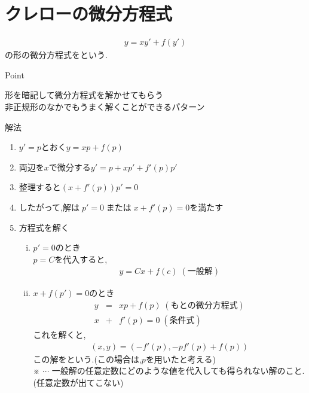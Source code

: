 \documentclass[a4paper]{jsarticle}
\begin{document}
\section{クレローの微分方程式}
\begin{eqnarray*}
    y=xy'+f\left(y'\right)
\end{eqnarray*}
の形の微分方程式をという.\\
\begin{itembox}[l]{Point}
    \begin{center}
        形を暗記して微分方程式を解かせてもらう\\
        非正規形のなかでもうまく解くことができるパターン
    \end{center}
\end{itembox}
\begin{itembox}[l]{解法}
    \begin{enumerate}[(1)]
        \item$y'=p$とおく\quad$y=xp+f\left(p\right)$
        \item 両辺を$x$で微分する\quad$y'=p+xp'+f'\left(p\right)p'$
        \item 整理すると\quad$\left(x+f'\left(p\right)\right)p'=0$
        \item したがって,解は$\;p'=0\;$または$\; x+f'\left(p\right)=0$を満たす
        \item 方程式を解く
              \begin{enumerate}[(i)]
                  \item $p'=0$のとき\\
                        $p=C$を代入すると,
                        \begin{eqnarray*}
                            y=Cx+f\left(c\right)\;(一般解)
                        \end{eqnarray*}
                  \item $x+f\left(p'\right)=0$のとき
                        \begin{eqnarray*}
                            y&=&xp+f\left(p\right)\; (もとの微分方程式)\\
                            x&+&f'\left(p\right)=0\; (条件式)
                        \end{eqnarray*}
                        これを解くと,
                        \begin{eqnarray*}
                            \left(x,y\right)=\left(-f'\left(p\right),-pf'\left(p\right)+f\left(p\right)\right)
                        \end{eqnarray*}
                        この解をという.(この場合は,$p$を用いたと考える)\\
                        ※ $\cdots$ 一般解の任意定数にどのような値を代入しても得られない解のこと.\\
                        \quad(任意定数が出てこない)
              \end{enumerate}
    \end{enumerate}
\end{itembox}
\end{document}
